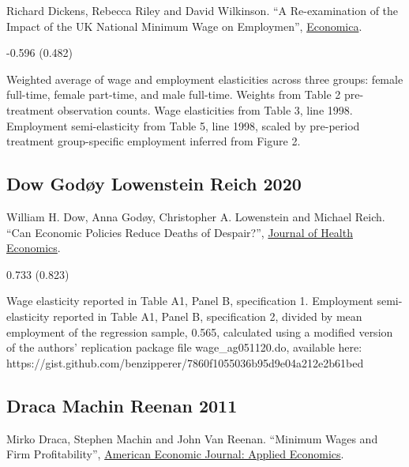 \noindent Richard Dickens, Rebecca Riley and David Wilkinson. ``A Re-examination of the Impact of the UK National Minimum Wage on Employmen'', \href{https://doi.org/10.1111/ecca.12158}{Economica}.

\vspace{0.7em}

 -0.596 (0.482)

\vspace{0.7em}

 Weighted average of wage and employment elasticities across three groups: female full-time, female part-time, and male full-time. Weights from Table 2 pre-treatment observation counts. Wage elasticities from Table 3, line 1998. Employment semi-elasticity from Table 5, line 1998, scaled by pre-period treatment group-specific employment inferred from Figure 2.

\subsection*{Dow Godøy Lowenstein Reich 2020}
\vspace{-0.7em}

\noindent William H. Dow, Anna Godøy, Christopher A. Lowenstein and Michael Reich. ``Can Economic Policies Reduce Deaths of Despair?'', \href{https://doi.org/10.1016/j.jhealeco.2020.102372}{Journal of Health Economics}.

\vspace{0.7em}

 0.733 (0.823)

\vspace{0.7em}

 Wage elasticity reported in Table A1, Panel B, specification 1. Employment semi-elasticity reported in Table A1, Panel B, specification 2, divided by mean employment of the regression sample, 0.565, calculated using a modified version of the authors' replication package file wage\_ag051120.do, available here: https://gist.github.com/benzipperer/7860f1055036b95d9e04a212e2b61bed

\subsection*{Draca Machin Reenan 2011}
\vspace{-0.7em}

\noindent Mirko Draca, Stephen Machin and John Van Reenan. ``Minimum Wages and Firm Profitability'', \href{https://doi.org/10.1257/app.3.1.129}{American Economic Journal: Applied Economics}.

